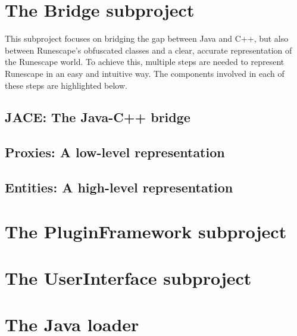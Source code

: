 \documentclass[]{article}
\begin{document}
\section{The Bridge subproject}
	This subproject focuses on bridging the gap between Java and C++, but also between Runescape's obfuscated classes and a clear, accurate representation of the Runescape world. To achieve this, multiple steps are needed to represent Runescape in an easy and intuitive way. The components involved in each of these steps are highlighted below.
	
	\subsection{JACE: The Java-C++ bridge}

	\subsection{Proxies: A low-level representation}
	
	\subsection{Entities: A high-level representation}
\section{The PluginFramework subproject}


\section{The UserInterface subproject}


\section{The Java loader}
\end{document}

